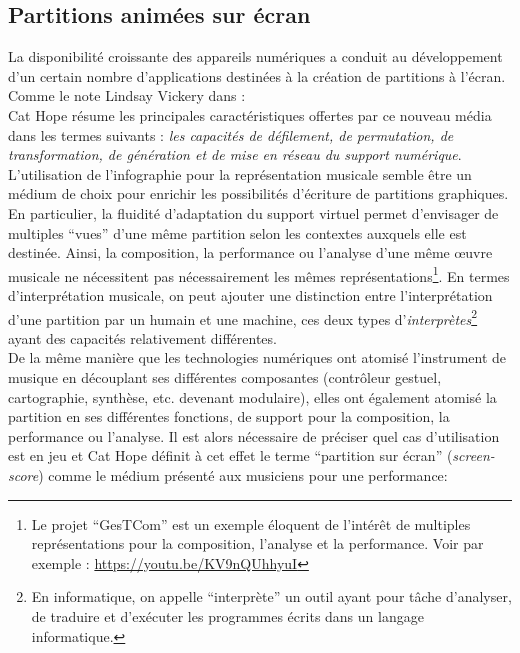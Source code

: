 \subsection{Partitions animées sur écran}

\noindent La disponibilité croissante des appareils numériques a conduit au développement d'un certain nombre d'applications destinées à la création de partitions à l'écran. Comme le note Lindsay Vickery dans \cite{vickery_limitations_2014} : \\
\indent Cat Hope résume les principales caractéristiques offertes par ce nouveau média dans les termes suivants \cite{hope_screen_2011}: \textit{les capacités de défilement, de permutation, de transformation, de génération et de mise en réseau du support numérique}.\\
\indent L'utilisation de l'infographie pour la représentation musicale semble être un médium de choix pour enrichir les possibilités d'écriture de partitions graphiques. En particulier, la fluidité d'adaptation du support virtuel permet d'envisager de multiples ``vues'' d'une même partition selon les contextes auxquels elle est destinée. Ainsi, la composition, la performance ou l'analyse d'une même œuvre musicale ne nécessitent pas nécessairement les mêmes représentations\footnote{Le projet ``GesTCom'' \cite{antoniadis_gesture_2014} est un exemple éloquent de l'intérêt de multiples représentations pour la composition, l'analyse et la performance. Voir par exemple : \url{https://youtu.be/KV9nQUhhyuI}}. En termes d'interprétation musicale, on peut ajouter une distinction entre l'interprétation d'une partition par un humain et une machine, ces deux types d'\textit{interprètes}\footnote{En informatique, on appelle ``interprète'' un outil ayant pour tâche d'analyser, de traduire et d'exécuter les programmes écrits dans un langage informatique.} ayant des capacités relativement différentes.\\
\indent De la même manière que les technologies numériques ont atomisé l'instrument de musique en découplant ses différentes composantes (contrôleur gestuel, cartographie, synthèse, etc. devenant modulaire), elles ont également atomisé la partition en ses différentes fonctions, de support pour la composition, la performance ou l'analyse. Il est alors nécessaire de préciser quel cas d'utilisation est en jeu et Cat Hope définit à cet effet le terme ``partition sur écran'' (\textit{screen-score}) \cite{hope_screen_2011} comme le médium présenté aux musiciens pour une performance: \\
